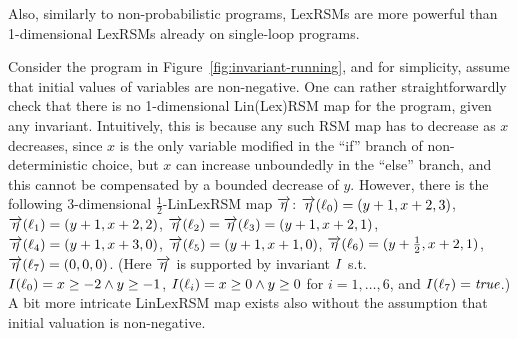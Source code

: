 Also, similarly to non-probabilistic programs, LexRSMs are more powerful than 
1-dimensional LexRSMs already on 
single-loop programs.

\newcommand{\olem}{\overrightarrow{\lem}}

\begin{example}
\label{ex:oneloop}
Consider the program in Figure~\ref{fig:invariant-running}, and for simplicity, 
assume that initial values of variables are non-negative. One can rather 
straightforwardly check that there is no 1-dimensional Lin(Lex)RSM map for the 
program, given any invariant. Intuitively, this is because any such RSM map has 
to 
decrease as $x$ decreases, since $x$ is the only variable modified in the 
``if'' branch of non-deterministic choice, but $x$ can increase unboundedly in 
the ``else'' branch, and this cannot be compensated by a bounded decrease of 
$y$. However, there is the following $3$-dimensional $\frac{1}{2}$-LinLexRSM 
map 
$\overrightarrow{\eta}$: $\olem(\loc_0)=(y+1,x+2,3)$, $\olem(\loc_1) = 
(y+1,x+2,2)$, $\olem(\loc_2)=\olem(\loc_3)=(y+1,x+2,1)$, 
$\olem(\loc_4)=(y+1,x+3,0)$, $\olem(\loc_5)=(y+1,x+1,0)$, 
$\olem(\loc_6)=(y+\frac{1}{2},x+2,1)$, $\olem(\loc_7)=(0,0,0)$. (Here $\olem$ 
is supported by invariant $I$ s.t. $I(\ell_0)=x\geq -2 \wedge y\geq -1 $, 
$I(\ell_i)=x\geq 0 \wedge y\geq 0$ for $i=1,\dots,6$, and 
$I(\ell_7)=\mathit{true}$.) A bit more intricate LinLexRSM map exists also 
without the assumption that initial valuation is non-negative.
\end{example}



